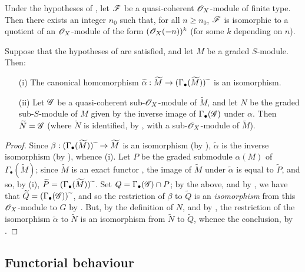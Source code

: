 \begin{corollary}[2.7.10]
\label{II.2.7.10}
Under the hypotheses of , let $\mathscr{F}$ be a quasi-coherent $\mathscr{O}_X$-module of finite type.
Then there exists an integer $n_0$ such that, for all $n\geq n_0$, $\mathscr{F}$ is isomorphic to a quotient of an $\mathscr{O}_X$-module of the form $(\mathscr{O}_X(-n))^k$ (for some $k$ depending on $n$).
\end{corollary}

\begin{proposition}[2.7.11]
\label{II.2.7.11}
Suppose that the hypotheses of  are satisfied, and let $M$ be a graded $S$-module.
Then:
\begin{enumerate}
  \item[{\rm(i)}] The canonical homomorphism $\widetilde{\alpha}:\widetilde{M}\to(\Gamma_\bullet(\widetilde{M}))\supertilde$ is an isomorphism.
  \item[{\rm(ii)}] Let $\mathscr{G}$ be a quasi-coherent sub-$\mathscr{O}_X$-module of $\widetilde{M}$, and let $N$ be the graded sub-$S$-module of $M$ given by the  inverse image of $\Gamma_\bullet(\mathscr{G})$ under $\alpha$.
    Then $\widetilde{N}=\mathscr{G}$ (where $\widetilde{N}$ is identified, by , with a sub-$\mathscr{O}_X$-module of $\widetilde{M}$).
\end{enumerate}
\end{proposition}

\begin{proof}
Since $\beta:(\Gamma_\bullet(\widetilde{M}))\supertilde\to\widetilde{M}$ is an isomorphism (by ), $\widetilde{\alpha}$ is the inverse isomorphism (by ), whence (i).
Let $P$ be the graded submodule $\alpha(M)$ of $\Gamma_\bullet(\widetilde{M})$;
since $\widetilde{M}$ is an exact functor , the image of $\widetilde{M}$ under $\widetilde{\alpha}$ is equal to $\widetilde{P}$, and so, by (i), $\widetilde{P}=(\Gamma_\bullet(\widetilde{M})){\,\widetilde{\,}\,}$.
Set $Q=\Gamma_\bullet(\mathscr{G})\cap P$;
by the above, and by , we have that $\widetilde{Q}=(\Gamma_\bullet(\mathscr{G})){\,\widetilde{\,}\,}$, and so the restriction of $\beta$ to $\widetilde{Q}$ is an \emph{isomorphism} from this $\mathscr{O}_X$-module to $G$ by .
But, by the definition of $N$, and by , the restriction of the isomorphism $\widetilde{\alpha}$ to $\widetilde{N}$ is an isomorphism from $\widetilde{N}$ to $\widetilde{Q}$, whence the conclusion, by .
\end{proof}


\subsection{Functorial behaviour}
\label{subsection:II.2.8}
